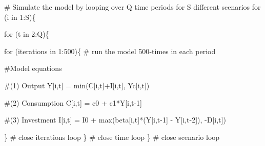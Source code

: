 \documentclass[
  letterpaper,
  DIV=11,
  numbers=noendperiod]{scrreprt}
\newenvironment{Shaded}{\begin{snugshade}}{\end{snugshade}}
\newcommand{\CommentTok}[1]{\textcolor[rgb]{0.37,0.37,0.37}{#1}}
\newcommand{\ControlFlowTok}[1]{\textcolor[rgb]{0.00,0.23,0.31}{#1}}
\newcommand{\DecValTok}[1]{\textcolor[rgb]{0.68,0.00,0.00}{#1}}
\newcommand{\FunctionTok}[1]{\textcolor[rgb]{0.28,0.35,0.67}{#1}}
\newcommand{\NormalTok}[1]{\textcolor[rgb]{0.00,0.23,0.31}{#1}}
\newcommand{\OtherTok}[1]{\textcolor[rgb]{0.00,0.23,0.31}{#1}}
\newcommand{\SpecialCharTok}[1]{\textcolor[rgb]{0.37,0.37,0.37}{#1}}
\begin{document}
\begin{Shaded}
\begin{Highlighting}[]
\CommentTok{\# Simulate the model by looping over Q time periods for S different scenarios}
\ControlFlowTok{for}\NormalTok{ (i }\ControlFlowTok{in} \DecValTok{1}\SpecialCharTok{:}\NormalTok{S)\{}
  
  \ControlFlowTok{for}\NormalTok{ (t }\ControlFlowTok{in} \DecValTok{2}\SpecialCharTok{:}\NormalTok{Q)\{}
    
    \ControlFlowTok{for}\NormalTok{ (iterations }\ControlFlowTok{in} \DecValTok{1}\SpecialCharTok{:}\DecValTok{500}\NormalTok{)\{ }\CommentTok{\# run the model 500{-}times in each period}
      
    \CommentTok{\#Model equations}
    
    \CommentTok{\#(1) Output}
\NormalTok{    Y[i,t] }\OtherTok{=} \FunctionTok{min}\NormalTok{(C[i,t]}\SpecialCharTok{+}\NormalTok{I[i,t], Yc[i,t])}
    
    \CommentTok{\#(2) Consumption}
\NormalTok{    C[i,t] }\OtherTok{=}\NormalTok{ c0 }\SpecialCharTok{+}\NormalTok{ c1}\SpecialCharTok{*}\NormalTok{Y[i,t}\DecValTok{{-}1}\NormalTok{]}
    
    \CommentTok{\#(3) Investment}
\NormalTok{    I[i,t] }\OtherTok{=}\NormalTok{ I0 }\SpecialCharTok{+} \FunctionTok{max}\NormalTok{(beta[i,t]}\SpecialCharTok{*}\NormalTok{(Y[i,t}\DecValTok{{-}1}\NormalTok{] }\SpecialCharTok{{-}}\NormalTok{ Y[i,t}\DecValTok{{-}2}\NormalTok{]), }\SpecialCharTok{{-}}\NormalTok{D[i,t]) }
    
\NormalTok{    \} }\CommentTok{\# close iterations loop}
\NormalTok{  \}   }\CommentTok{\# close time loop}
\NormalTok{\}     }\CommentTok{\# close scenario loop}
\end{Highlighting}
\end{Shaded}
\end{document}
